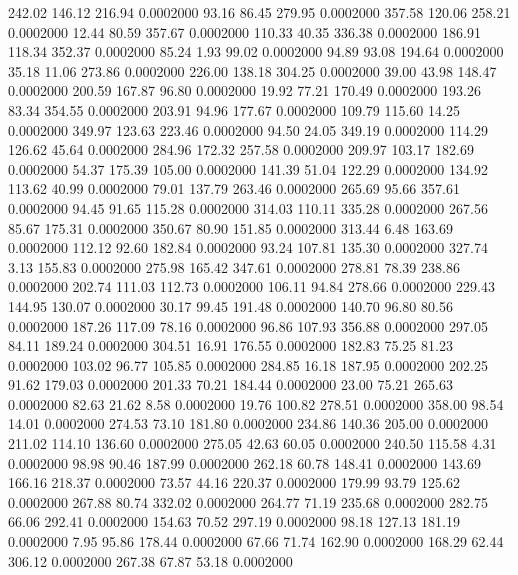  242.02  146.12  216.94   0.0002000
  93.16   86.45  279.95   0.0002000
 357.58  120.06  258.21   0.0002000
  12.44   80.59  357.67   0.0002000
 110.33   40.35  336.38   0.0002000
 186.91  118.34  352.37   0.0002000
  85.24    1.93   99.02   0.0002000
  94.89   93.08  194.64   0.0002000
  35.18   11.06  273.86   0.0002000
 226.00  138.18  304.25   0.0002000
  39.00   43.98  148.47   0.0002000
 200.59  167.87   96.80   0.0002000
  19.92   77.21  170.49   0.0002000
 193.26   83.34  354.55   0.0002000
 203.91   94.96  177.67   0.0002000
 109.79  115.60   14.25   0.0002000
 349.97  123.63  223.46   0.0002000
  94.50   24.05  349.19   0.0002000
 114.29  126.62   45.64   0.0002000
 284.96  172.32  257.58   0.0002000
 209.97  103.17  182.69   0.0002000
  54.37  175.39  105.00   0.0002000
 141.39   51.04  122.29   0.0002000
 134.92  113.62   40.99   0.0002000
  79.01  137.79  263.46   0.0002000
 265.69   95.66  357.61   0.0002000
  94.45   91.65  115.28   0.0002000
 314.03  110.11  335.28   0.0002000
 267.56   85.67  175.31   0.0002000
 350.67   80.90  151.85   0.0002000
 313.44    6.48  163.69   0.0002000
 112.12   92.60  182.84   0.0002000
  93.24  107.81  135.30   0.0002000
 327.74    3.13  155.83   0.0002000
 275.98  165.42  347.61   0.0002000
 278.81   78.39  238.86   0.0002000
 202.74  111.03  112.73   0.0002000
 106.11   94.84  278.66   0.0002000
 229.43  144.95  130.07   0.0002000
  30.17   99.45  191.48   0.0002000
 140.70   96.80   80.56   0.0002000
 187.26  117.09   78.16   0.0002000
  96.86  107.93  356.88   0.0002000
 297.05   84.11  189.24   0.0002000
 304.51   16.91  176.55   0.0002000
 182.83   75.25   81.23   0.0002000
 103.02   96.77  105.85   0.0002000
 284.85   16.18  187.95   0.0002000
 202.25   91.62  179.03   0.0002000
 201.33   70.21  184.44   0.0002000
  23.00   75.21  265.63   0.0002000
  82.63   21.62    8.58   0.0002000
  19.76  100.82  278.51   0.0002000
 358.00   98.54   14.01   0.0002000
 274.53   73.10  181.80   0.0002000
 234.86  140.36  205.00   0.0002000
 211.02  114.10  136.60   0.0002000
 275.05   42.63   60.05   0.0002000
 240.50  115.58    4.31   0.0002000
  98.98   90.46  187.99   0.0002000
 262.18   60.78  148.41   0.0002000
 143.69  166.16  218.37   0.0002000
  73.57   44.16  220.37   0.0002000
 179.99   93.79  125.62   0.0002000
 267.88   80.74  332.02   0.0002000
 264.77   71.19  235.68   0.0002000
 282.75   66.06  292.41   0.0002000
 154.63   70.52  297.19   0.0002000
  98.18  127.13  181.19   0.0002000
   7.95   95.86  178.44   0.0002000
  67.66   71.74  162.90   0.0002000
 168.29   62.44  306.12   0.0002000
 267.38   67.87   53.18   0.0002000
